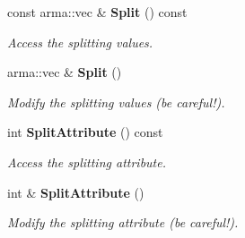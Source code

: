\begin{DoxyCompactItemize}
$$const arma\-::vec \& {\bf Split} () const 
\begin{DoxyCompactList}\small\item\em Access the splitting values. \end{DoxyCompactList}\item 
arma\-::vec \& {\bf Split} ()
\begin{DoxyCompactList}\small\item\em Modify the splitting values (be careful!). \end{DoxyCompactList}\item 
int {\bf Split\-Attribute} () const 
\begin{DoxyCompactList}\small\item\em Access the splitting attribute. \end{DoxyCompactList}\item 
int \& {\bf Split\-Attribute} ()
\begin{DoxyCompactList}\small\item\em Modify the splitting attribute (be careful!). \end{DoxyCompactList}\end{DoxyCompactItemize}

